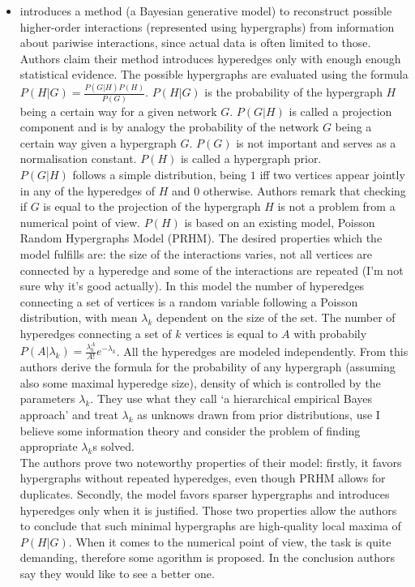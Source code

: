\begin{itemize}
    \item 
    \cite{Young2021}
    introduces a method (a Bayesian generative model) to reconstruct possible higher-order interactions (represented using hypergraphs) from information about pariwise interactions, since actual data is often limited to those. Authors claim their method introduces hyperedges only with enough enough statistical evidence. The possible hypergraphs are evaluated using the formula \(P(H|G) = \frac{P(G|H)P(H)}{P(G)}\). \(P(H|G)\) is the probability of the hypergraph $H$ being a certain way for a given network $G$. $P(G|H)$ is called a projection component and is by analogy the probability of the network $G$ being a certain way given a hypergraph $G$. $P(G)$ is not important and serves as a normalisation constant. $P(H)$ is called a hypergraph prior. \\ 
    $P(G|H)$ follows a simple distribution, being $1$ iff two vertices appear jointly in any of the hyperedges of $H$ and $0$ otherwise. Authors remark that checking if $G$ is equal to the projection of the hypergraph $H$ is not a problem from a numerical point of view.
    $P(H)$ is based on an existing model, Poisson Random Hypergraphs Model (PRHM). The desired properties which the model fulfills are: the size of the interactions varies, not all vertices are connected by a hyperedge and some of the interactions are repeated (I'm not sure why it's good actually). 
    In this model the number of hyperedges connecting a set of vertices is a random variable following a Poisson distribution, with mean $\lambda_k$ dependent on the size of the set. The number of hyperedges connecting a set of $k$ vertices is equal to $A$ with probabily $P(A|\lambda_k) = \frac{\lambda_k^A}{A!}e^{-\lambda_k}$. All the hyperedges are modeled independently. 
    From this authors derive the formula for the probability of any hypergraph (assuming also some maximal hyperedge size), density of which is controlled by the parameters $\lambda_k$. They use what they call `a hierarchical empirical Bayes approach' and treat $\lambda_k$ as unknows drawn from prior distributions, use I believe some information theory and consider the problem of finding appropriate $\lambda_k$s solved. \\ 
    The authors prove two noteworthy properties of their model: firstly, it favors hypergraphs without repeated hyperedges, even though PRHM allows for duplicates. Secondly, the model favors sparser hypergraphs and introduces hyperedges only when it is justified. Those two properties allow the authors to conclude that such minimal hypergraphs are high-quality local maxima of $P(H|G)$. When it comes to the numerical point of view, the task is quite demanding, therefore some agorithm is proposed. In the conclusion authors say they would like to see a better one. \\

\end{itemize}
